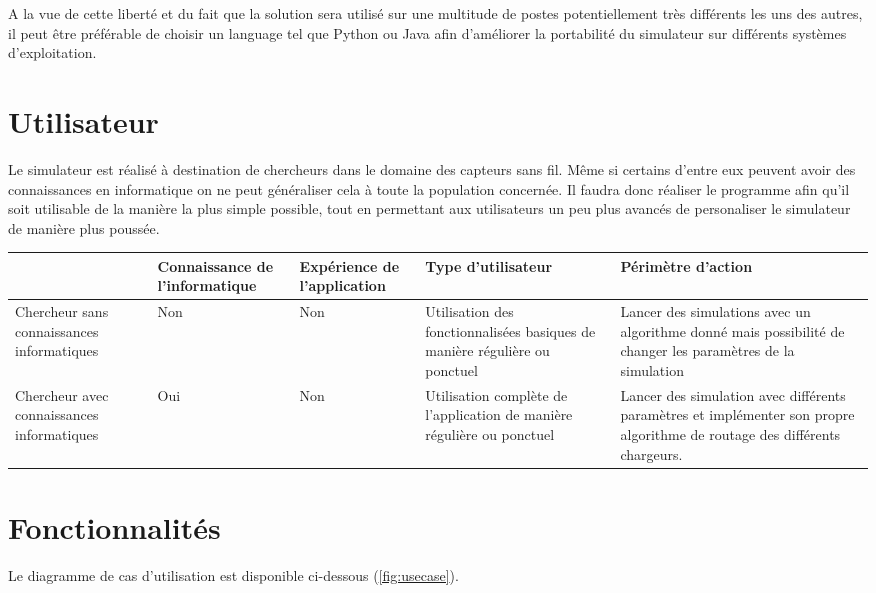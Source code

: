 \documentclass[noposter]{polytech}
\begin{document}
		A la vue de cette liberté et du fait que la solution sera utilisé sur une multitude de postes potentiellement très différents les uns des autres, il peut être préférable de choisir un language tel que Python ou Java afin d'améliorer la portabilité du simulateur sur différents systèmes d'exploitation.
	
	\section{Utilisateur\label{sec:users}} %
		Le simulateur est réalisé à destination de chercheurs dans le domaine des capteurs sans fil.
		Même si certains d'entre eux peuvent avoir des connaissances en informatique on ne peut généraliser cela à toute la population concernée.
		Il faudra donc réaliser le programme afin qu'il soit utilisable de la manière la plus simple possible, tout en permettant aux utilisateurs un peu plus avancés de personaliser le simulateur de manière plus poussée.
		
		\begin{center}
			\centering
			\begin{tabularx}{\textwidth}{|X|X|X|X|X|}
				\hline
				& Connaissance de l'informatique & Expérience de l'application & Type d'utilisateur & Périmètre d'action\\\hline
				Chercheur sans connaissances informatiques & Non & Non & Utilisation des fonctionnalisées basiques de manière régulière ou ponctuel & Lancer des simulations avec un algorithme donné mais possibilité de changer les paramètres de la simulation\\\hline
				Chercheur avec connaissances informatiques & Oui & Non & Utilisation complète de l'application de manière régulière ou ponctuel & Lancer des simulation avec différents paramètres et implémenter son propre algorithme de routage des différents chargeurs.\\\hline
			\end{tabularx}
		\end{center}

	
	\section{Fonctionnalités}%
		Le diagramme de cas d'utilisation est disponible ci-dessous (\autoref{fig:usecase}).
		
\end{document}
